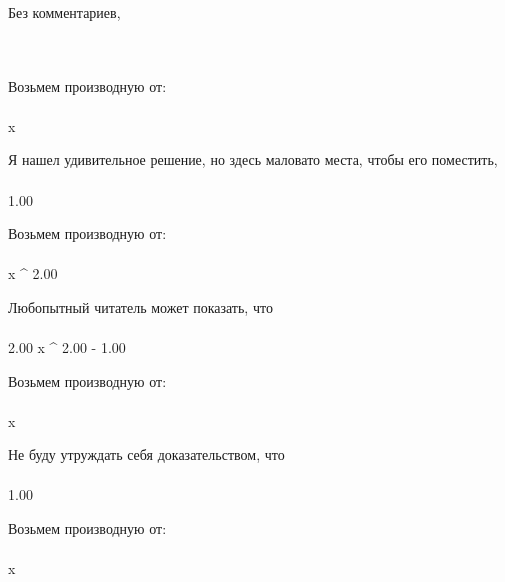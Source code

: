Без комментариев, 
\begin{gather}
\end{gather}
\begin{}
\\
\end{}
Возьмем производную от:
\begin{gather}
\end{gather}
\begin{}
x \\
\end{}
Я нашел удивительное решение, но здесь маловато места, чтобы его поместить, 
\begin{gather}
\end{gather}
\begin{}
1.00 \\
\end{}
Возьмем производную от:
\begin{gather}
\end{gather}
\begin{}
x ^ {2.00 }\\
\end{}
Любопытный читатель может показать, что
\begin{gather}
\end{gather}
\begin{}
2.00  \cdot x ^ {2.00 - 1.00 }\\
\end{}
Возьмем производную от:
\begin{gather}
\end{gather}
\begin{}
x \\
\end{}
Не буду утруждать себя доказательством, что
\begin{gather}
\end{gather}
\begin{}
1.00 \\
\end{}
Возьмем производную от:
\begin{gather}
\end{gather}
\begin{}
\sin x \\
\end{}
